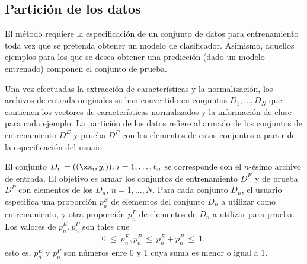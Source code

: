 %
%
%
\subsection{Partición de los datos}
%
El método requiere la especificación de un conjunto de datos para
entrenamiento toda vez que se pretenda obtener un modelo de
clasificador. Asimismo, aquellos ejemplos para los que se desea
obtener una predicción (dado un modelo entrenado) componen el conjunto
de prueba.

Una vez efectuadas la extracción de características y la
normalización, los archivos de entrada originales se han convertido en
conjuntos $D_1,\ldots,D_N$ que contienen los vectores de
características normalizados y la información de clase para cada
ejemplo. La partición de los datos refiere al armado de los conjuntos
de entrenamiento $D^E$ y prueba $D^P$ con los elementos de estos
conjuntos a partir de la especificación del usuaio.

El conjunto $D_n=((\xx_i,y_i)),\,i=1,\ldots,\ell_n$ se corresponde con
el $n$-ésimo archivo de entrada. El objetivo es armar los conjuntos de
entrenamiento $D^E$ y de prueba $D^P$ con elementos de los
$D_n,\,n=1,\ldots,N$.  Para cada conjunto $D_n$, el usuario especifica
una proporción $p_n^E$ de elementos del conjunto $D_n$ a utilizar como
entrenamiento, y otra proporción $p_n^P$ de elementos de $D_n$ a
utilizar para prueba. Los valores de $p_n^E,p_n^P$ son tales que
%
\begin{align}
  0\ \leq\ p_n^E, p_n^P\ \leq\  p_n^E + p_n^P\ \leq\ 1,
\end{align}
%
esto es, $p_n^E$ y $p_n^P$ son números enre 0 y 1 cuya suma es menor o
igual a 1.

